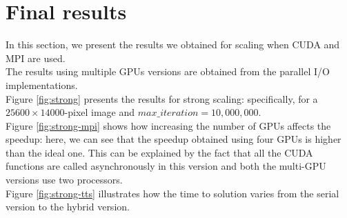 \documentclass[11pt,a4paper]{article}
\begin{document}
\vspace{-0.2cm}
\section{Final results}

In this section, we present the results we obtained for scaling when CUDA and MPI are used.\\
The results using multiple GPUs versions are obtained from the parallel I/O implementations.\\[-7pt]

Figure \ref{fig:strong} presents the results for strong scaling: specifically, for a $25600\times14000$-pixel image and $max\_iteration=10,000,000$.\\
Figure \ref{fig:strong-mpi} shows how increasing the number of GPUs affects the speedup: here, we can see that the speedup obtained using four GPUs is higher than the ideal one.
This can be explained by the fact that all the CUDA functions are called asynchronously in this version and both the multi-GPU versions use two processors.\\
Figure \ref{fig:strong-tts} illustrates how the time to solution varies from the serial version to the hybrid version.\\[-7pt]
\end{document}

